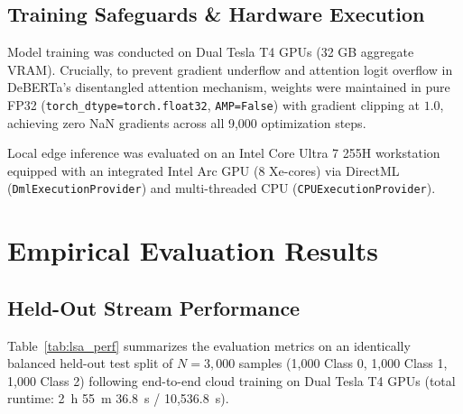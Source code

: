 \documentclass[10pt,journal,compsoc]{IEEEtran}
\begin{document}
\subsection{Training Safeguards \& Hardware Execution}
Model training was conducted on Dual Tesla T4 GPUs (32 GB aggregate VRAM). Crucially, to prevent gradient underflow and attention logit overflow in DeBERTa's disentangled attention mechanism, weights were maintained in pure FP32 (\texttt{torch\_dtype=torch.float32}, \texttt{AMP=False}) with gradient clipping at $1.0$, achieving zero NaN gradients across all 9,000 optimization steps.

Local edge inference was evaluated on an Intel Core Ultra 7 255H workstation equipped with an integrated Intel Arc GPU (8 Xe-cores) via DirectML (\texttt{DmlExecutionProvider}) and multi-threaded CPU (\texttt{CPUExecutionProvider}).

\section{Empirical Evaluation Results}

\subsection{Held-Out Stream Performance}
Table~\ref{tab:lsa_perf} summarizes the evaluation metrics on an identically balanced held-out test split of $N = 3,000$ samples (1,000 Class 0, 1,000 Class 1, 1,000 Class 2) following end-to-end cloud training on Dual Tesla T4 GPUs (total runtime: 2~h 55~m 36.8~s / 10,536.8~s).
\end{document}
